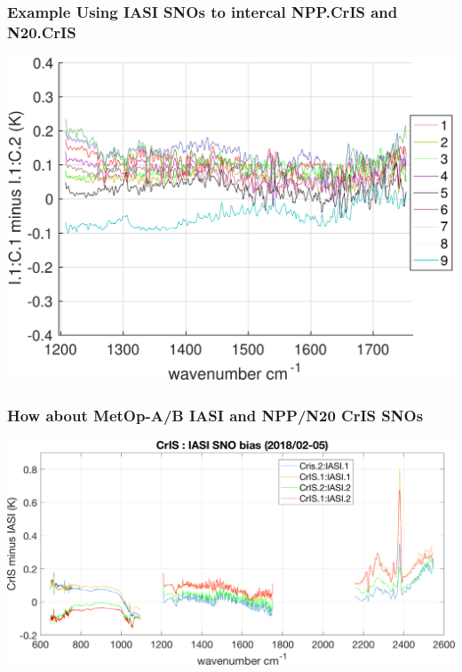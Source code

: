 \documentclass[10pt,t]{beamer}
\begin{document}
\begin{frame}
  \frametitle{Example Using IASI SNOs to intercal NPP.CrIS and N20.CrIS }
  \begin{center}
    \includegraphics[width=0.95\linewidth]{./Figs/sno_i1c1_i1c2_dble_diff_lr_mw_2018febjun_aslp.pdf}
  \end{center}
  
\end{frame}
\begin{frame}
  \frametitle{How about MetOp-A/B IASI and NPP/N20 CrIS SNOs}
  \begin{center}
    \includegraphics[width=0.95\linewidth]{./Figs/sno_iasi_cris_all_combin_mean_bias_spectral.png}
  \end{center}
  
\end{frame}
\end{document}
